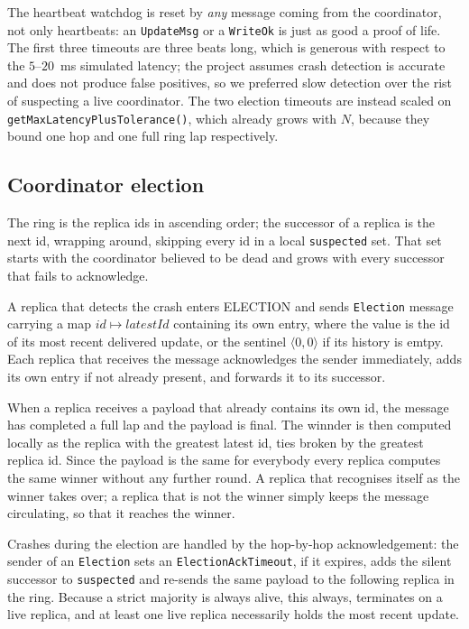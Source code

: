 The heartbeat watchdog is reset by \emph{any} message coming from the coordinator, not only heartbeats: an \texttt{UpdateMsg} or a \texttt{WriteOk} is just as good a proof of life. The first three timeouts are three beats long, which is generous with respect to the $5$--$20$~ms simulated latency; the project assumes crash detection is accurate and does not produce false positives, so we preferred slow detection over the rist of suspecting a live coordinator. The two election timeouts are instead scaled on \texttt{getMaxLatencyPlusTolerance()}, which already grows with $N$, because they bound one hop and one full ring lap respectively.

\subsection*{Coordinator election}

The ring is the replica ids in ascending order; the successor of a replica is the next id, wrapping around, skipping every id in a local \texttt{suspected} set. That set starts with the coordinator believed to be dead and grows with every successor that fails to acknowledge.

A replica that detects the crash enters ELECTION and sends \texttt{Election} message carrying a map $id \mapsto latestId$ containing its own entry, where the value is the id of its most recent delivered update, or the sentinel $\langle 0, 0 \rangle$ if its history is emtpy. Each replica that receives the message acknowledges the sender immediately, adds its own entry if not already present, and forwards it to its successor.

When a replica receives a payload that already contains its own id, the message has completed a full lap and the payload is final. The winnder is then computed locally as the replica with the greatest latest id, ties broken by the greatest replica id. Since the payload is the same for everybody every replica computes the same winner without any further round. A replica that recognises itself as the winner takes over; a replica that is not the winner simply keeps the message circulating, so that it reaches the winner.

Crashes during the election are handled by the hop-by-hop acknowledgement: the sender of an \texttt{Election} sets an \texttt{ElectionAckTimeout}, if it expires, adds the silent successor to \texttt{suspected} and re-sends the same payload to the following replica in the ring. Because a strict majority is always alive, this always, terminates on a live replica, and at least one live replica necessarily holds the most recent update.

